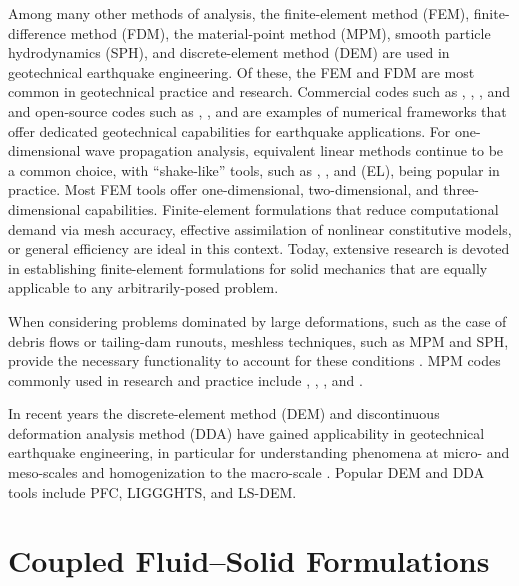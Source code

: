 Among many other methods of analysis, the finite-element method (FEM), finite-difference method (FDM), the material-point method (MPM), smooth particle hydrodynamics (SPH), and discrete-element method (DEM) are used in geotechnical earthquake engineering. Of these, the FEM and FDM are most common in geotechnical practice and research. Commercial codes such as , , , and  and open-source codes such as , , and  are examples of numerical frameworks that offer dedicated geotechnical capabilities for earthquake applications. For one-dimensional wave propagation analysis, equivalent linear methods continue to be a common choice, with ``shake-like'' tools, such as , , and  (EL), being popular in practice. Most FEM tools offer one-dimensional, two-dimensional, and three-dimensional capabilities. Finite-element formulations that reduce computational demand via mesh accuracy, effective assimilation of nonlinear constitutive models, or general efficiency \citep{McGann12, McGann15} are ideal in this context. Today, extensive research is devoted in establishing finite-element formulations for solid mechanics that are equally applicable to any arbitrarily-posed problem.

When considering problems dominated by large deformations, such as the case of debris flows or tailing-dam runouts, meshless techniques, such as MPM and SPH, provide the necessary functionality to account for these conditions \citep{Mast15}. MPM codes commonly used in research and practice include , , , and .

In recent years the discrete-element method (DEM) and discontinuous deformation analysis method (DDA) have gained applicability in geotechnical earthquake engineering, in particular for understanding phenomena at micro- and meso-scales and homogenization to the macro-scale \citep{kawamoto2018}. Popular DEM and DDA tools include PFC, LIGGGHTS, and LS-DEM.   

\section{Coupled Fluid--Solid Formulations}
\label{sec:resp_geotech_2}

